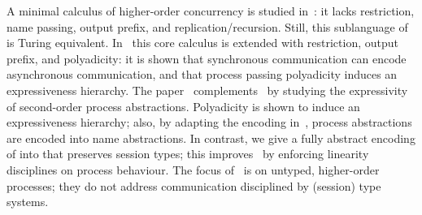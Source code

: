 \documentclass[runningheads]{llncs}
\begin{document}
{A minimal calculus of higher-order concurrency is studied in~\cite{DBLP:journals/iandc/LanesePSS11}: it lacks restriction,  name passing, output prefix, %
and %
replication/recursion. 
Still, this  sublanguage of \HO is Turing equivalent.
In~\cite{DBLP:conf/icalp/LanesePSS10}
this core calculus  is extended with restriction,
output prefix, and polyadicity: it is shown that 
synchronous communication can encode asynchronous communication, %
and that process passing polyadicity induces an expressiveness  hierarchy. %
The paper~\cite{DBLP:conf/wsfm/XuYL13} 
complements~\cite{DBLP:conf/icalp/LanesePSS10} 
by studying the expressivity %
of 
second-order process abstractions.
Polyadicity is shown to induce an expressiveness hierarchy; 
also,
by adapting the encoding in~\cite{SangiorgiD:expmpa},
process abstractions are encoded into name abstractions.
In contrast, we 
give a fully abstract encoding of
 \PHOpp into \HO that preserves session types; this improves~\cite{DBLP:conf/icalp/LanesePSS10,DBLP:conf/wsfm/XuYL13}   
by enforcing linearity disciplines on process behaviour.
The focus of~\cite{DBLP:conf/icalp/LanesePSS10,XuActa2012,DBLP:conf/wsfm/XuYL13,DBLP:journals/corr/XuYL15} is on 
untyped, higher-order processes; they
do not address communication disciplined by 
(session) type systems.



}
\end{document}

